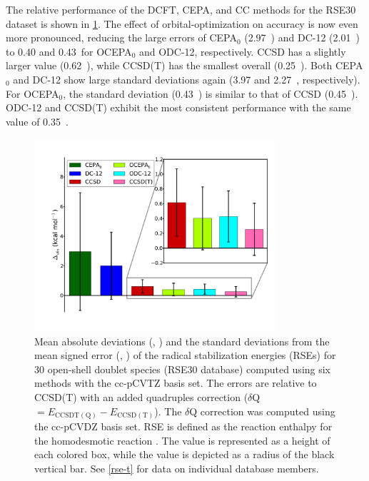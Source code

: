 The relative performance of the DCFT, CEPA, and CC methods for the RSE30 dataset
is shown in \cref{rse-f}.
The effect of orbital-optimization on accuracy is now even more pronounced,
reducing the large \mae errors of CEPA$_0$ (2.97~\kcal) and DC-12 (2.01~\kcal)
to 0.40 and 0.43~\kcal for OCEPA$_0$ and ODC-12, respectively. CCSD has a
slightly larger \mae value (0.62~\kcal), while CCSD(T) has the smallest overall
\mae (0.25~\kcal).
Both CEPA$_0$ and DC-12 show large standard deviations again (3.97 and
2.27~\kcal, respectively).
For OCEPA$_0$, the standard deviation (0.43~\kcal) is similar to that of CCSD
(0.45~\kcal). ODC-12 and CCSD(T) exhibit the most consistent performance with
the same \std value of 0.35~\kcal.

\begin{figure}
	\centering
	\caption{%
        \label{rse-f}
        Mean absolute deviations (\mae, \kcal) and the standard deviations from
        the mean signed error (\std, \kcal) of the radical stabilization
        energies (RSEs) for 30 open-shell doublet species (RSE30 database)
        computed using six methods with the cc-pCVTZ basis set.
        The errors are relative to CCSD(T) with an added quadruples correction
        ($\delta$Q  $= E_\mathrm{CCSDT(Q)}-E_\mathrm{CCSD(T)}$).
        The $\delta$Q correction was computed using the cc-pCVDZ basis set.
        RSE is defined as the reaction enthalpy for the homodesmotic reaction
        .
        The \mae value is represented as a height of each colored box, while the
        \std value is depicted as a radius of the black vertical bar.
        See \cref{rse-t} for data on individual database members.
	}
	\includegraphics[width=0.8\textwidth]{figures/rse.pdf}
\end{figure}

